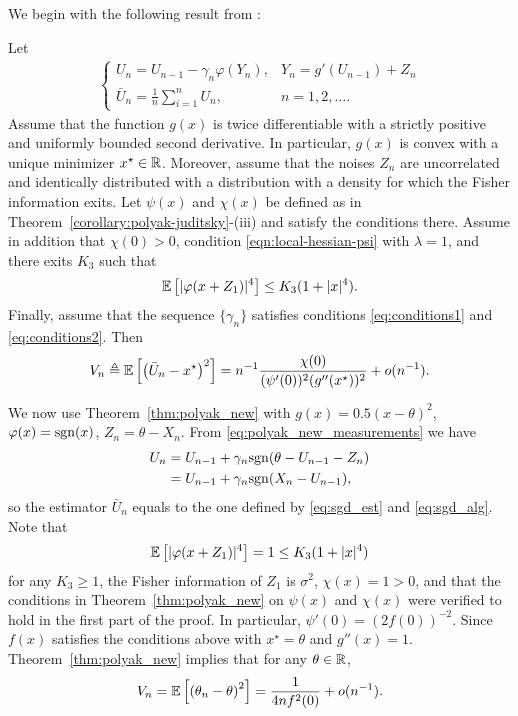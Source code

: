 We begin with the following result from \cite{polyak1990new}:
\begin{corollary}
  \label{corollary:polyak-mse}
  Let
  \begin{align} \label{eq:polyak_new_measurements}
    \begin{cases}
      U_n = U_{n-1} - \gamma_n \varphi(Y_n), & Y_n = g'(U_{n-1})+Z_n \\
      \bar{U}_n= \frac{1}{n} \sum_{i=1}^n U_n, & n=1,2,\ldots.
    \end{cases}
  \end{align}
  Assume that the function $g(x)$ is twice differentiable with a strictly
  positive and uniformly bounded second derivative. In particular, $g(x)$ is
  convex with a unique minimizer $x^\star \in \mathbb{R}$. Moreover, assume that the
  noises $Z_n$ are uncorrelated and identically distributed with a
  distribution with a density for which the Fisher information exits. Let
  $\psi(x)$ and $\chi(x)$ be defined as in
  Theorem~\ref{corollary:polyak-juditsky}-(iii) and satisfy the conditions
  there. Assume in addition that $\chi(0)>0$, condition
  \eqref{eqn:local-hessian-psi} with $\lambda = 1$, and there exits $K_3$ such
  that
  \begin{equation*}
    \mathbb{E}\left[   | \varphi(x+Z_1) |^4 \right] \leq K_3(1+|x|^4). 
  \end{equation*}
  Finally, assume that the sequence $\{\gamma_n \}$ satisfies conditions \eqref{eq:conditions1} and \eqref{eq:conditions2}. Then
  \begin{equation*}
    V_n \triangleq \mathbb{E}\left[  \left(\bar{U}_n-x^\star \right)^2 \right] = n^{-1}\frac{\chi(0)} { (\psi'(0))^2 (g''(x^\star))^2 } + o(n^{-1}).
  \end{equation*}
\end{corollary}

We now use Theorem~\ref{thm:polyak_new} with $g(x) = 0.5(x-\theta)^2$, $\varphi(x) = \mathrm{sgn}(x)$, $Z_n = \theta-X_n$. From \eqref{eq:polyak_new_measurements} we have
\begin{align*} 
U_n & = U_{n-1} + \gamma_n \mathrm{sgn}(\theta-U_{n-1} - Z_n )  \\
& = U_{n-1} + \gamma_n \mathrm{sgn}(X_n-U_{n-1} ),
\end{align*}
so the estimator $\bar{U}_n$ equals to the one defined by \eqref{eq:sgd_est} and \eqref{eq:sgd_alg}. Note that
\begin{equation*}
\mathbb{E}\left[  | \varphi(x+Z_1) |^4 \right] = 1 \leq K_3(1+|x|^4)
\end{equation*}
for any $K_3\geq 1$, the Fisher information of $Z_1$ is $\sigma^2$, $\chi(x) = 1 > 0$, and that 
the conditions in Theorem~\ref{thm:polyak_new} on $\psi(x)$ and $\chi(x)$ were verified to hold in the first part of the proof. In particular, $\psi'(0) = (2f(0))^{-2}$. Since $f(x)$ satisfies the conditions above with $x^\star = \theta$ and $g''(x) = 1$. Theorem~\ref{thm:polyak_new} implies that for any $\theta \in \mathbb{R}$, 
\begin{equation*}
V_n = \mathbb{E}\left[  \left({\theta}_n-\theta \right)^2 \right] = \frac{1}{4n f^2(0)} + o(n^{-1}).
\end{equation*}


